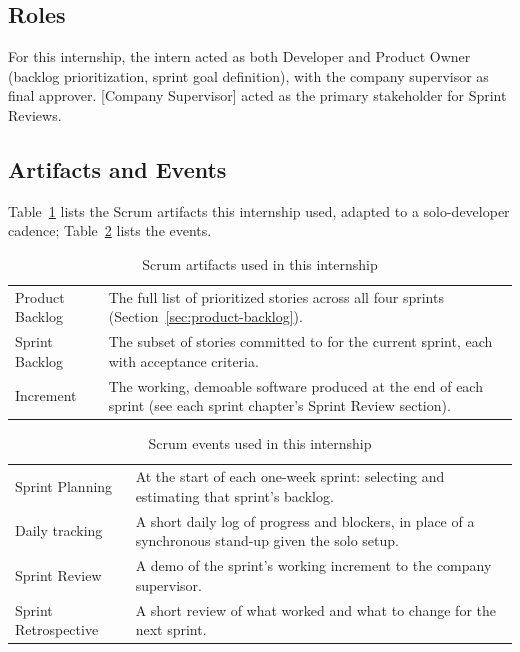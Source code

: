 \subsection{Roles}

For this internship, the intern acted as both Developer and Product
Owner (backlog prioritization, sprint goal definition), with the
company supervisor as final approver. [Company Supervisor] acted as the
primary stakeholder for Sprint Reviews.

\subsection{Artifacts and Events}

Table~\ref{tab:artifacts} lists the Scrum artifacts this internship used, adapted to a solo-developer cadence; Table~\ref{tab:events} lists the events.

\begin{table}[H]
  \centering
  \caption{Scrum artifacts used in this internship}
  \label{tab:artifacts}
  \begin{tabular}{@{}p{3.2cm}p{14.4cm}@{}}
    \toprule
    Product Backlog & The full list of prioritized stories across all four sprints (Section~\ref{sec:product-backlog}). \\
    Sprint Backlog & The subset of stories committed to for the current sprint, each with acceptance criteria. \\
    Increment & The working, demoable software produced at the end of each sprint (see each sprint chapter's Sprint Review section). \\
    \bottomrule
  \end{tabular}
\end{table}

\begin{table}[H]
  \centering
  \caption{Scrum events used in this internship}
  \label{tab:events}
  \begin{tabular}{@{}p{3.2cm}p{14.4cm}@{}}
    \toprule
    Sprint Planning & At the start of each one-week sprint: selecting and estimating that sprint's backlog. \\
    Daily tracking & A short daily log of progress and blockers, in place of a synchronous stand-up given the solo setup. \\
    Sprint Review & A demo of the sprint's working increment to the company supervisor. \\
    Sprint Retrospective & A short review of what worked and what to change for the next sprint. \\
    \bottomrule
  \end{tabular}
\end{table}

